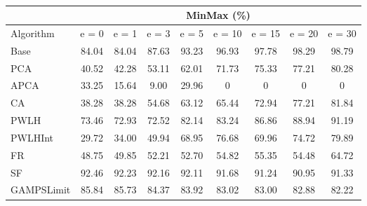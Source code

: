 \begin{table}
\newcommand{\best}{\cellcolor{violet!20}}
\centering\hspace*{-2.1cm}\begin{tabular}{| l | c | c | c | c | c | c | c | c |}\cline{2-9}\multicolumn{1}{c|}{}& \multicolumn{8}{c|}{MinMax (\%)}\\\hline
{Algorithm} & {e = 0} & {e = 1} & {e = 3} & {e = 5} & {e = 10} & {e = 15} & {e = 20} & {e = 30} \\\hline
{Base} & {84.04} & {84.04} & {87.63} & {93.23} & {96.93} & {97.78} & {98.29} & {98.79} \\\hline
{PCA} & {40.52} & {42.28} & {53.11} & {62.01} & {71.73} & {75.33} & {77.21} & {80.28} \\\hline
{APCA} & {33.25} & {\best15.64} & {\best9.00} & {\best29.96} & {\best0} & {\best0} & {\best0} & {\best0} \\\hline
{CA} & {38.28} & {38.28} & {54.68} & {63.12} & {65.44} & {72.94} & {77.21} & {81.84} \\\hline
{PWLH} & {73.46} & {72.93} & {72.52} & {82.14} & {83.24} & {86.86} & {88.94} & {91.19} \\\hline
{PWLHInt} & {\best29.72} & {34.00} & {49.94} & {68.95} & {76.68} & {69.96} & {74.72} & {79.89} \\\hline
{FR} & {48.75} & {49.85} & {52.21} & {52.70} & {54.82} & {55.35} & {54.48} & {64.72} \\\hline
{SF} & {92.46} & {92.23} & {92.16} & {92.11} & {91.68} & {91.24} & {90.95} & {91.33} \\\hline
{GAMPSLimit} & {85.84} & {85.73} & {84.37} & {83.92} & {83.02} & {83.00} & {82.88} & {82.22} \\\hline
\end{tabular}
\caption{\captionminmax}
\label{experiments:minmax}
\end{table}
